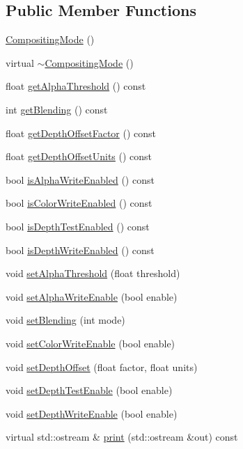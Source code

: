 \subsection*{Public Member Functions}
\begin{CompactItemize}
\item 
\hyperlink{classm3g_1_1CompositingMode_5abfd1a798f1327aac4b92f55d4ecc0c}{CompositingMode} ()
\item 
virtual \hyperlink{classm3g_1_1CompositingMode_0bba5b15be7249e946c9aaf94631ce3b}{$\sim$CompositingMode} ()
\item 
float \hyperlink{classm3g_1_1CompositingMode_19ab71363ea77fa86aa6fafce87f06cb}{getAlphaThreshold} () const 
\item 
int \hyperlink{classm3g_1_1CompositingMode_078954de3d786bd11dc98b06f237bbbb}{getBlending} () const 
\item 
float \hyperlink{classm3g_1_1CompositingMode_d24a4116e72678164f31d7a48f74be6b}{getDepthOffsetFactor} () const 
\item 
float \hyperlink{classm3g_1_1CompositingMode_add4c6c3bc01c1d0689e0588af79039f}{getDepthOffsetUnits} () const 
\item 
bool \hyperlink{classm3g_1_1CompositingMode_bfcec134f769763d492011fc8ccadcce}{isAlphaWriteEnabled} () const 
\item 
bool \hyperlink{classm3g_1_1CompositingMode_35ffa21944393c774552003dd2cb03ea}{isColorWriteEnabled} () const 
\item 
bool \hyperlink{classm3g_1_1CompositingMode_4dd97b29a6e12c5e64477ab1546f93f1}{isDepthTestEnabled} () const 
\item 
bool \hyperlink{classm3g_1_1CompositingMode_0ee4c812abd4a99e0373158d36dc45d9}{isDepthWriteEnabled} () const 
\item 
void \hyperlink{classm3g_1_1CompositingMode_6becafaefd18a2b8b1adeba491576837}{setAlphaThreshold} (float threshold)
\item 
void \hyperlink{classm3g_1_1CompositingMode_5204f1acac056f82d322262703be67b0}{setAlphaWriteEnable} (bool enable)
\item 
void \hyperlink{classm3g_1_1CompositingMode_4c09465dfec9efa000c115c5c2867b63}{setBlending} (int mode)
\item 
void \hyperlink{classm3g_1_1CompositingMode_84f7cba08f5a2bea05de4fc3154a50b2}{setColorWriteEnable} (bool enable)
\item 
void \hyperlink{classm3g_1_1CompositingMode_4c825055ad0b5910ef4f9136d9a8e588}{setDepthOffset} (float factor, float units)
\item 
void \hyperlink{classm3g_1_1CompositingMode_5f1afccdc51665bb04c971579d8ee05c}{setDepthTestEnable} (bool enable)
\item 
void \hyperlink{classm3g_1_1CompositingMode_a3275c9589ef319c6ba6f5c22d0b2860}{setDepthWriteEnable} (bool enable)
\item 
virtual std::ostream \& \hyperlink{classm3g_1_1CompositingMode_6fea17fa1532df3794f8cb39cb4f911f}{print} (std::ostream \&out) const 
\end{CompactItemize}
